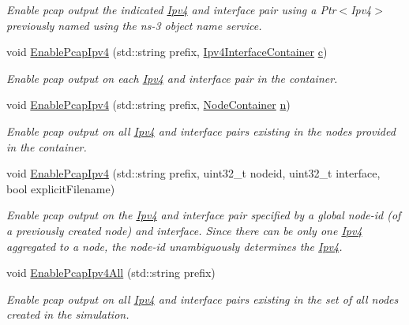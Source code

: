 \begin{DoxyCompactItemize}
\begin{DoxyCompactList}\small\item\em Enable pcap output the indicated \hyperlink{classns3_1_1Ipv4}{Ipv4} and interface pair using a Ptr$<$\+Ipv4$>$ previously named using the ns-\/3 object name service. \end{DoxyCompactList}\item 
void \hyperlink{classns3_1_1PcapHelperForIpv4_a3ca0f619ab92568052b358e3c50ca744}{Enable\+Pcap\+Ipv4} (std\+::string prefix, \hyperlink{classns3_1_1Ipv4InterfaceContainer}{Ipv4\+Interface\+Container} \hyperlink{mmwave_2model_2fading-traces_2fading__trace__generator_8m_ae0323a9039add2978bf5b49550572c7c}{c})
\begin{DoxyCompactList}\small\item\em Enable pcap output on each \hyperlink{classns3_1_1Ipv4}{Ipv4} and interface pair in the container. \end{DoxyCompactList}\item 
void \hyperlink{classns3_1_1PcapHelperForIpv4_ad4402620f7aee17ff7199235576ee2b2}{Enable\+Pcap\+Ipv4} (std\+::string prefix, \hyperlink{classns3_1_1NodeContainer}{Node\+Container} \hyperlink{lte__link__budget__x2__handover__measures_8m_abdb05bc5a064cf642a06c83b3392f148}{n})
\begin{DoxyCompactList}\small\item\em Enable pcap output on all \hyperlink{classns3_1_1Ipv4}{Ipv4} and interface pairs existing in the nodes provided in the container. \end{DoxyCompactList}\item 
void \hyperlink{classns3_1_1PcapHelperForIpv4_ad0d6beb21ddbffac1437d5931ff4425a}{Enable\+Pcap\+Ipv4} (std\+::string prefix, uint32\+\_\+t nodeid, uint32\+\_\+t interface, bool explicit\+Filename)
\begin{DoxyCompactList}\small\item\em Enable pcap output on the \hyperlink{classns3_1_1Ipv4}{Ipv4} and interface pair specified by a global node-\/id (of a previously created node) and interface. Since there can be only one \hyperlink{classns3_1_1Ipv4}{Ipv4} aggregated to a node, the node-\/id unambiguously determines the \hyperlink{classns3_1_1Ipv4}{Ipv4}. \end{DoxyCompactList}\item 
void \hyperlink{classns3_1_1PcapHelperForIpv4_ada4775887925dc107c3587d90beba76b}{Enable\+Pcap\+Ipv4\+All} (std\+::string prefix)
\begin{DoxyCompactList}\small\item\em Enable pcap output on all \hyperlink{classns3_1_1Ipv4}{Ipv4} and interface pairs existing in the set of all nodes created in the simulation. \end{DoxyCompactList}\end{DoxyCompactItemize}


